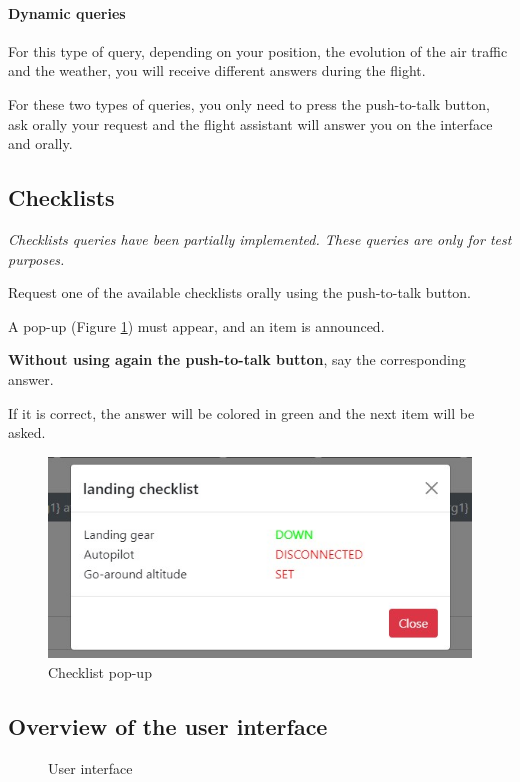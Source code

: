 \documentclass[12pt,oneside,a4]{article}
\let\tempone\itemize
\let\temptwo\enditemize
\renewenvironment{itemize}{\tempone\addtolength{\itemsep}{-0.5\baselineskip}}{\temptwo}
\begin{document}
\paragraph{Dynamic queries}
For this type of query, depending on your position, the evolution of the air traffic
and the weather, you will receive different answers during the flight.

\vspace{1em}

For these two types of queries, you only need to press the push-to-talk button, ask orally your request and
the flight assistant will answer you on the interface and orally.

\subsection{Checklists}

\textit{
Checklists queries have been partially implemented. These queries are only for test purposes.
}

\begin{itemize}
    \item Request one of the available checklists orally using the push-to-talk button. 
    \item A pop-up (Figure \ref{fig:checklist}) must appear, and an item is announced.
    \item \textbf{Without using again the push-to-talk button}, say the corresponding answer.
    \item If it is correct, the answer will be colored in green and the next item will be asked.
\end{itemize}



\begin{figure}[h!]
    \centering
    \includegraphics[width=.5\linewidth]{checklist.jpg}
    \caption{Checklist pop-up}
    \label{fig:checklist}
\end{figure}

\newpage
\begin{landscape}
\thispagestyle{empty}
\section*{Overview of the user interface}

\begin{figure}[h!]
    \centering
    \resizebox{\linewidth}{!}{
        
    }
    \caption{User interface}
    \label{fig:user_interface}
\end{figure}
\end{landscape}
\end{document}
